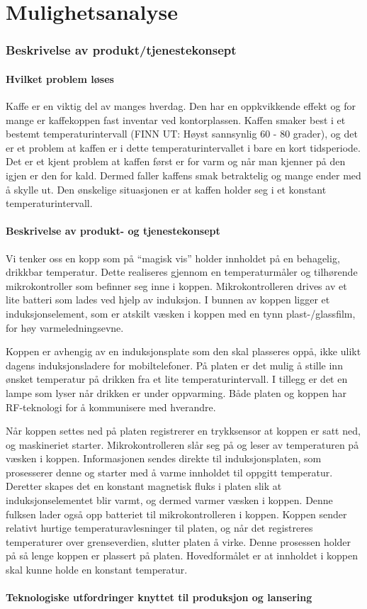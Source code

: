 \chapter{Mulighetsanalyse}
\subsection{Beskrivelse av produkt/tjenestekonsept}
\subsubsection{Hvilket problem løses}
Kaffe er en viktig del av manges hverdag. Den har en oppkvikkende effekt og for mange er kaffekoppen fast inventar ved kontorplassen. Kaffen smaker best i et bestemt temperaturintervall (FINN UT: Høyst sannsynlig 60 - 80 grader), og det er et problem at kaffen er i dette temperaturintervallet i bare en kort tidsperiode. Det er et kjent problem at kaffen først er for varm og når man kjenner på den igjen er den for kald. Dermed faller kaffens smak betraktelig og mange ender med å skylle ut. Den ønskelige situasjonen er at kaffen holder seg i et konstant temperaturintervall. 

\subsubsection{Beskrivelse av produkt- og tjenestekonsept}
Vi tenker oss en kopp som på “magisk vis” holder innholdet på en behagelig, drikkbar temperatur. Dette realiseres gjennom en temperaturmåler og tilhørende mikrokontroller som befinner seg inne i koppen. Mikrokontrolleren drives av et lite batteri som lades ved hjelp av induksjon. I bunnen av koppen ligger et induksjonselement, som er atskilt væsken i koppen med en tynn plast-/glassfilm, for høy varmeledningsevne.

Koppen er avhengig av en induksjonsplate som den skal plasseres oppå, ikke ulikt dagens induksjonsladere for mobiltelefoner. På platen er det mulig å stille inn ønsket temperatur på drikken fra et lite temperaturintervall. I tillegg er det en lampe som lyser når drikken er under oppvarming. Både platen og koppen har RF-teknologi for å kommunisere med hverandre.

Når koppen settes ned på platen registrerer en trykksensor at koppen er satt ned, og maskineriet starter. Mikrokontrolleren slår seg på og leser av temperaturen på væsken i koppen. Informasjonen sendes direkte til induksjonsplaten, som prosesserer denne og starter med å varme innholdet til oppgitt temperatur. Deretter skapes det en konstant magnetisk fluks i platen slik at induksjonselementet blir varmt, og dermed varmer væsken i koppen. Denne fulksen lader også opp batteriet til mikrokontrolleren i koppen. 
Koppen sender relativt hurtige temperaturavlesninger til platen, og når det registreres temperaturer over grenseverdien, slutter platen å virke. Denne prosessen holder på så lenge koppen er plassert på platen. Hovedformålet er at innholdet i koppen skal kunne holde en konstant temperatur.

\subsubsection{Teknologiske utfordringer knyttet til produksjon og lansering}
